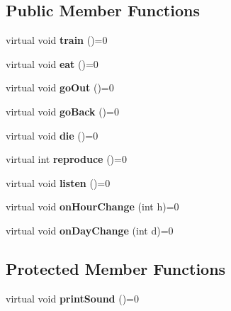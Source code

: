\subsection*{Public Member Functions}
\begin{DoxyCompactItemize}
\item 
\mbox{\label{class_intelligence_animal_a3d1742ff1c76aed9394748f11d5d8789}} 
virtual void {\bfseries train} ()=0
\item 
\mbox{\label{class_intelligence_animal_aeb924c39e9496e3775b0ef2af35c638f}} 
virtual void {\bfseries eat} ()=0
\item 
\mbox{\label{class_intelligence_animal_af58201f17c0847f0a92154462d1fa627}} 
virtual void {\bfseries go\+Out} ()=0
\item 
\mbox{\label{class_intelligence_animal_aa09abbbe91dddc5e37a01d17bc5423e2}} 
virtual void {\bfseries go\+Back} ()=0
\item 
\mbox{\label{class_intelligence_animal_ada72ecbbe6cfcbdf7be0000915f0b69e}} 
virtual void {\bfseries die} ()=0
\item 
\mbox{\label{class_intelligence_animal_ab8374471442da78816c4f082a907b881}} 
virtual int {\bfseries reproduce} ()=0
\item 
\mbox{\label{class_intelligence_animal_aeb33e78d2fa3b5f2e5ef84f5baf916f7}} 
virtual void {\bfseries listen} ()=0
\item 
\mbox{\label{class_intelligence_animal_a9bc1ebd1a95082178b3e83dbeee16415}} 
virtual void {\bfseries on\+Hour\+Change} (int h)=0
\item 
\mbox{\label{class_intelligence_animal_a7a96244e5e54f37649c27513af122983}} 
virtual void {\bfseries on\+Day\+Change} (int d)=0
\end{DoxyCompactItemize}
\subsection*{Protected Member Functions}
\begin{DoxyCompactItemize}
\item 
\mbox{\label{class_intelligence_animal_a40e0aae3c7b4c4aa4c7e75891243996b}} 
virtual void {\bfseries print\+Sound} ()=0
\end{DoxyCompactItemize}
